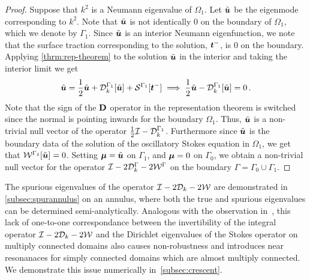 
\begin{proof}
  Suppose that $k^2$ is a Neumann eigenvalue of $\Omega_{1}$.
  Let $\tilde{{\boldsymbol u}}$ be the eigenmode corresponding to $k^2$. 
  Note that $\tilde{{\boldsymbol u}}$ is not identically $0$ on the boundary
  of $\Omega_{1}$, which we denote by $\Gamma_1$.
  Since $\tilde{{\boldsymbol u}}$ is an interior Neumann eigenfunction, we note that
  the surface traction corresponding to the solution, ${\boldsymbol t}^{-}$, is $0$
  on the boundary.
  Applying \cref{thrm:rep-theorem} to the
  solution $\tilde{{\boldsymbol u}}$ in the interior
  and taking the interior limit we get
\begin{equation}
\tilde{{\boldsymbol u}} = \frac{1}{2}\tilde{{\boldsymbol u}} + {\mathcal D}^{\Gamma_{1}}_{k}[\tilde{{\boldsymbol u}}] +
{\mathcal S}^{\Gamma_{1}} [{\boldsymbol t}^{-}] \implies \frac{1}{2} \tilde{{\boldsymbol u}} - {\mathcal D}^{\Gamma_{1}}_{k}[\tilde{{\boldsymbol u}}]
= 0\, .
\end{equation}
Note that the sign of the ${\bf D}$ operator in the
representation theorem is switched since the normal
is pointing inwards for the boundary $\Omega_{1}$.
Thus, $\tilde{{\boldsymbol u}}$ is a non-trivial null vector of the operator 
$\frac{1}{2}\mathcal I - {\mathcal D}^{\Gamma_{1}}_{k}$. 
Furthermore since $\tilde{{\boldsymbol u}}$ is the boundary data of 
the solution of the oscillatory Stokes equation
in $\Omega_{1}$, we get that ${\mathcal W}^{\Gamma_{1}}[\tilde{{\boldsymbol u}}] = 0$.
Setting ${\boldsymbol \mu} = \tilde{{\boldsymbol u}}$ on $\Gamma_{1}$, and
${\boldsymbol \mu} = 0$ on $\Gamma_{0}$, we obtain a non-trivial null
vector for the operator $\mathcal I - 2{\mathcal D}^{\Gamma}_{k} -2{\mathcal W}^{\Gamma}$
on the boundary $\Gamma = \Gamma_{0} \cup \Gamma_{1}$.
\end{proof}

The spurious eigenvalues of the operator $\mathcal I-2{\mathcal D}_{k}-2{\mathcal W}$
are demonstrated in \cref{subsec:spurannulus} on an annulus,
where both the true and spurious eigenvalues can be
determined semi-analytically. 
Analogous with the observation in~\cite{zhao2015robust},
this lack of one-to-one correspondance between
the invertibility of the integral operator $\mathcal I - 2{\mathcal D}_{k} - 2{\mathcal W}$
and the Dirichlet eigenvalues of the Stokes operator on multiply
connected domains also causes non-robustness and introduces near 
resonanaces for simply connected domains
which are almost multiply connected.
We demonstrate this issue numerically
in~\cref{subsec:crescent}.

